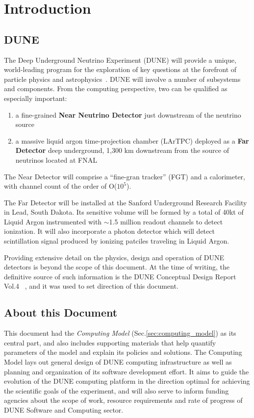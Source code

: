 \section{Introduction}
\subsection{DUNE}

The Deep Underground Neutrino Experiment (DUNE) will provide a unique, world-leading program
for the exploration of key questions at the forefront of particle physics and astrophysics~\cite{sciopps}.
DUNE will involve a number of subsystems and components. From the computing perspective, two can be
qualified as especially important:

\begin{enumerate}

\item a fine-grained \textbf{Near Neutrino Detector} just downstream of the neutrino source
\item a massive liquid argon time-projection chamber (LArTPC) deployed as a \textbf{Far
Detector} deep underground, 1,300 km downstream from the source of neutrinos located at FNAL

\end{enumerate}

The Near Detector will comprise a ``fine-gran tracker'' (FGT) and a calorimeter, with channel count of the order of O($10^{5}$).

The Far Detector will be installed at the Sanford Underground Research Facility in Lead, South Dakota.
Its sensitive volume will be formed by a total of 40kt of Liquid Argon instrumented with $\sim$1.5 million readout
channels to detect ionization. It will also incorporate a photon detector which will detect scintillation
signal produced by ionizing patciles traveling in Liquid Argon.

Providing extensive detail on the physics, design and operation of DUNE detectors  is beyond the scope of this document.
At the time of writing, the definitive source of such information is the DUNE Conceptual Design Report Vol.4 ~\cite{cdr_vol4_docdb}, and 
it was used to set direction of this document.


\subsection{About this Document}
\label{sec:modelrole}

This document had the \textit{Computing Model} (Sec.\ref{sec:computing_model}) as its central part, and also
includes supporting materials that help quantify parameters of the model and explain its policies and
solutions.
The Computing Model lays out general design of DUNE computing infrastructure as well as planning and
organization of its software development effort. It aims to guide the evolution of the DUNE computing
platform in the direction optimal for achieving the scientific goals of the experiment, and will also serve
to inform funding agencies about the scope of work, resource requirements and rate of progress of 
DUNE Software and Computing sector.


